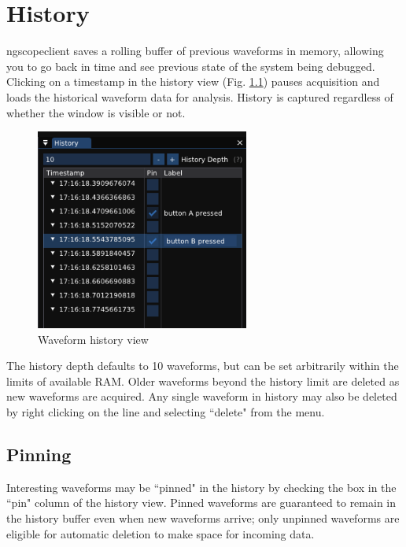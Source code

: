 \chapter{History}
\label{sec:history}

ngscopeclient saves a rolling buffer of previous waveforms in memory, allowing you to go back in time and see previous
state of the system being debugged. Clicking on a timestamp in the history view (Fig. \ref{historyview}) pauses
acquisition and loads the historical waveform data for analysis. History is captured regardless of whether the window
is visible or not.

\begin{figure}[H]
\centering
\includegraphics[width=7cm]{ng-images/history.png}
\caption{Waveform history view}
\label{historyview}
\end{figure}

The history depth defaults to 10 waveforms, but can be set arbitrarily within the limits of available RAM. Older
waveforms beyond the history limit are deleted as new waveforms are acquired. Any single waveform in history may also
be deleted by right clicking on the line and selecting ``delete" from the menu.


\section{Pinning}

Interesting waveforms may be ``pinned" in the history by checking the box in the ``pin" column of the history view.
Pinned waveforms are guaranteed to remain in the history buffer even when new waveforms arrive; only unpinned waveforms
are eligible for automatic deletion to make space for incoming data.

